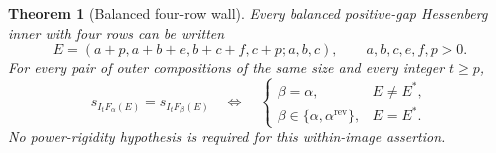 \documentclass[11pt,a4paper]{amsart}
\numberwithin{equation}{section}
\theoremstyle{plain}
\newtheorem{theorem}{Theorem}[section]
\theoremstyle{definition}
\begin{document}
\begin{theorem}[Balanced four-row wall]\label{thm:four-row-wall}
Every balanced positive-gap Hessenberg inner with four rows can be written
\begin{equation}\label{eq:four-row-parameters}
 E=(a+p,a+b+e,b+c+f,c+p;a,b,c),\qquad a,b,c,e,f,p>0.
\end{equation}
For every pair of outer compositions of the same size and every integer \(t\ge p\),
\begin{equation}\label{eq:four-row-wall}
 s_{I_tF_\alpha(E)}=s_{I_tF_\beta(E)}
 \quad\Longleftrightarrow\quad
 \begin{cases}
 \beta=\alpha,&E\ne E^*,\\
 \beta\in\{\alpha,\alpha^{\mathrm{rev}}\},&E=E^*.
 \end{cases}
\end{equation}
No power-rigidity hypothesis is required for this within-image assertion.
\end{theorem}
\end{document}
